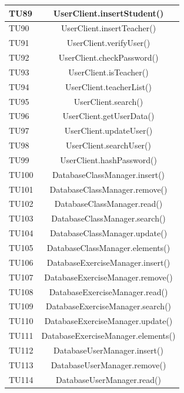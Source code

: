 \begin{longtable}{|>{\centering\arraybackslash}m{1.6cm}|c|}
		TU89 & UserClient.insertStudent()  \\ \hline
		\rowcolor{LightGray}
		TU90 & UserClient.insertTeacher()  \\ \hline
		TU91 & UserClient.verifyUser()  \\ \hline
		\rowcolor{LightGray}
		TU92 & UserClient.checkPassword()  \\ \hline
		TU93 & UserClient.isTeacher()  \\ \hline
		\rowcolor{LightGray}
		TU94 & UserClient.teacherList()  \\ \hline
		TU95 & UserClient.search()  \\ \hline
		\rowcolor{LightGray}
		TU96 & UserClient.getUserData()  \\ \hline
		TU97 & UserClient.updateUser()  \\ \hline
		\rowcolor{LightGray}
		TU98 & UserClient.searchUser()  \\ \hline
		TU99 & UserClient.hashPassword()  \\ \hline
		\rowcolor{LightGray}
		TU100 & DatabaseClassManager.insert()  \\ \hline
		TU101 & DatabaseClassManager.remove()  \\ \hline
		\rowcolor{LightGray}
		TU102 & DatabaseClassManager.read()  \\ \hline
		TU103 & DatabaseClassManager.search()  \\ \hline
		\rowcolor{LightGray}
		TU104 & DatabaseClassManager.update()  \\ \hline
		TU105 & DatabaseClassManager.elements()  \\ \hline
		\rowcolor{LightGray}
		TU106 & DatabaseExerciseManager.insert()  \\ \hline
		TU107 & DatabaseExerciseManager.remove()  \\ \hline
		\rowcolor{LightGray}
		TU108 & DatabaseExerciseManager.read()  \\ \hline
		TU109 & DatabaseExerciseManager.search()  \\ \hline
		\rowcolor{LightGray}
		TU110 & DatabaseExerciseManager.update()  \\ \hline
		TU111 & DatabaseExerciseManager.elements()  \\ \hline
		\rowcolor{LightGray}
		TU112 & DatabaseUserManager.insert()  \\ \hline
		TU113 & DatabaseUserManager.remove()  \\ \hline
		\rowcolor{LightGray}
		TU114 & DatabaseUserManager.read()  \\ \hline

\end{longtable}
